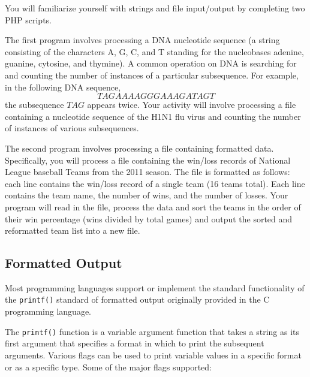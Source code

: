 \documentclass[12pt]{scrartcl}
\begin{document}
You will familiarize yourself with strings and file input/output 
by completing two PHP scripts.  

The first program involves processing a DNA nucleotide sequence (a 
string consisting of the characters A, G, C, and T standing for the 
nucleobases adenine, guanine, cytosine, and thymine).  A common 
operation on DNA is searching for and counting the number of instances 
of a particular subsequence.  For example, in the following DNA 
sequence, 
$$TAGAAAAGGGAAAGATAGT$$
the subsequence $TAG$ appears twice.  Your activity will involve 
processing a file containing a nucleotide sequence of the H1N1 flu 
virus and counting the number of instances of various subsequences.

The second program involves processing a file containing formatted 
data.  Specifically, you will process a file containing the win/loss 
records of National League baseball Teams from the 2011 season.  The 
file is formatted as follows: each line contains the win/loss record 
of a single team (16 teams total).  Each line contains the team name, 
the number of wins, and the number of losses.  Your program will read 
in the file, process the data and sort the teams in the order of their 
win percentage (wins divided by total games) and output the sorted and 
reformatted team list into a new file.

\subsection*{Formatted Output}

Most programming languages support or implement the standard 
functionality of the \texttt{printf()} standard of formatted 
output originally provided in the C programming language.

The \texttt{printf()} function is a variable argument 
function that takes a string as its first argument that specifies 
a format in which to print the subsequent arguments.  Various flags 
can be used to print variable values in a specific format or as a 
specific type.  Some of the major flags supported:
	
\end{document}
